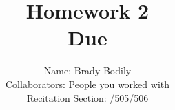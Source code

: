 \documentclass[]{exam}
\title{Homework 2\\
	Due \DTMdate{2020-02-07} %
	}
\date{ %
	}
\author{Name: Brady Bodily \\
		\footnotesize Collaborators: People you worked with  \\
		\footnotesize Recitation Section: \circled{501}/505/506
		}
\begin{document}
\maketitle

\printanswers %

\begin{questions}
    
	
	
	
	
	
	
	
\end{questions}
\end{document}
